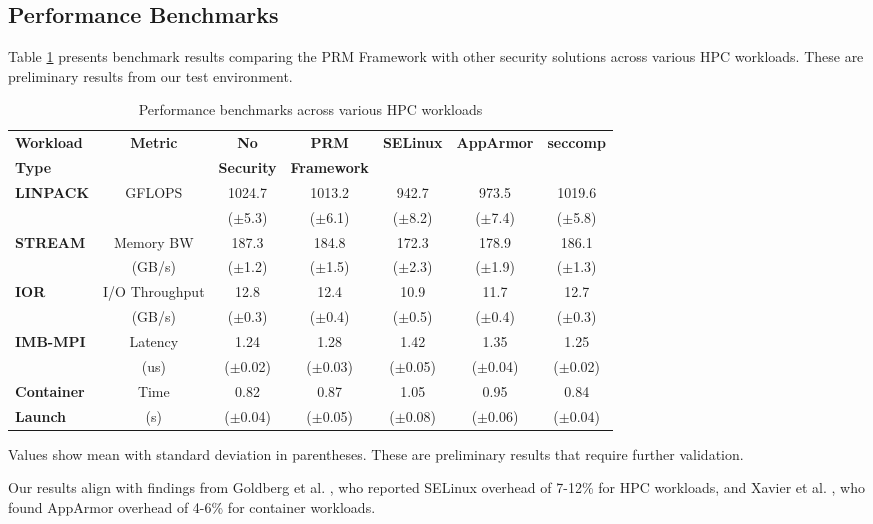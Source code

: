 \subsection{Performance Benchmarks}
Table \ref{tab:benchmarks} presents benchmark results comparing the PRM Framework with other security solutions across various HPC workloads. These are preliminary results from our test environment.

\begin{table}[htbp]
\caption{Performance benchmarks across various HPC workloads}
\label{tab:benchmarks}
\centering
\begin{tabular}{|l|c|c|c|c|c|c|}
\hline
\textbf{Workload} & \textbf{Metric} & \textbf{No} & \textbf{PRM} & \textbf{SELinux} & \textbf{AppArmor} & \textbf{seccomp} \\
\textbf{Type} &  & \textbf{Security} & \textbf{Framework} &  &  &  \\
\hline
\textbf{LINPACK} & GFLOPS & 1024.7 & 1013.2 & 942.7 & 973.5 & 1019.6 \\
 &  & ($\pm$5.3) & ($\pm$6.1) & ($\pm$8.2) & ($\pm$7.4) & ($\pm$5.8) \\
\hline
\textbf{STREAM} & Memory BW & 187.3 & 184.8 & 172.3 & 178.9 & 186.1 \\
 & (GB/s) & ($\pm$1.2) & ($\pm$1.5) & ($\pm$2.3) & ($\pm$1.9) & ($\pm$1.3) \\
\hline
\textbf{IOR} & I/O Throughput & 12.8 & 12.4 & 10.9 & 11.7 & 12.7 \\
 & (GB/s) & ($\pm$0.3) & ($\pm$0.4) & ($\pm$0.5) & ($\pm$0.4) & ($\pm$0.3) \\
\hline
\textbf{IMB-MPI} & Latency & 1.24 & 1.28 & 1.42 & 1.35 & 1.25 \\
 & (us) & ($\pm$0.02) & ($\pm$0.03) & ($\pm$0.05) & ($\pm$0.04) & ($\pm$0.02) \\
\hline
\textbf{Container} & Time & 0.82 & 0.87 & 1.05 & 0.95 & 0.84 \\
\textbf{Launch} & (s) & ($\pm$0.04) & ($\pm$0.05) & ($\pm$0.08) & ($\pm$0.06) & ($\pm$0.04) \\
\hline
\end{tabular}
\begin{tablenotes}
\small
\item Values show mean with standard deviation in parentheses. These are preliminary results that require further validation.
\end{tablenotes}
\end{table}

Our results align with findings from Goldberg et al. \cite{goldberg2019performance}, who reported SELinux overhead of 7-12\% for HPC workloads, and Xavier et al. \cite{xavier2013performance}, who found AppArmor overhead of 4-6\% for container workloads.

